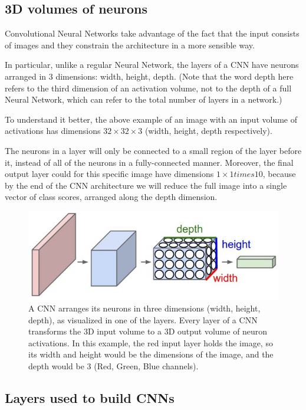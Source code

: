 \documentclass[%
oneside,                 %
final,                   %
10pt]{article}
\begin{document}
\subsection{3D volumes of neurons}

Convolutional Neural Networks take advantage of the fact that the
input consists of images and they constrain the architecture in a more
sensible way. 

In particular, unlike a regular Neural Network, the
layers of a CNN have neurons arranged in 3 dimensions: width,
height, depth. (Note that the word depth here refers to the third
dimension of an activation volume, not to the depth of a full Neural
Network, which can refer to the total number of layers in a network.)

To understand it better, the above example of an image 
with an input volume of
activations has dimensions $32\times 32\times 3$ (width, height,
depth respectively). 

The neurons in a layer will
only be connected to a small region of the layer before it, instead of
all of the neurons in a fully-connected manner. Moreover, the final
output layer could  for this specific image have dimensions $1\times 1 times 10$, 
because by the
end of the CNN architecture we will reduce the full image into a
single vector of class scores, arranged along the depth
dimension. 


\begin{figure}[!ht]  %
  \centerline{\includegraphics[width=0.6\linewidth]{figslides/cnn.jpeg}}
  \caption{
  A CNN arranges its neurons in three dimensions (width, height, depth), as visualized in one of the layers. Every layer of a CNN transforms the 3D input volume to a 3D output volume of neuron activations. In this example, the red input layer holds the image, so its width and height would be the dimensions of the image, and the depth would be 3 (Red, Green, Blue channels).
  }
\end{figure}




\subsection{Layers used to build CNNs}
\end{document}
